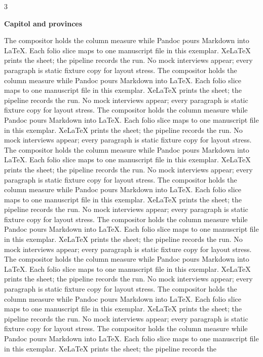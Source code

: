 \documentclass[
]{article}
\begin{document}
\begin{multicols}{3}

\textbf{Capitol and provinces}

The compositor holds the column measure while Pandoc pours Markdown into
LaTeX. Each folio slice maps to one manuscript file in this exemplar.
XeLaTeX prints the sheet; the pipeline records the run. No mock
interviews appear; every paragraph is static fixture copy for layout
stress. The compositor holds the column measure while Pandoc pours
Markdown into LaTeX. Each folio slice maps to one manuscript file in
this exemplar. XeLaTeX prints the sheet; the pipeline records the run.
No mock interviews appear; every paragraph is static fixture copy for
layout stress. The compositor holds the column measure while Pandoc
pours Markdown into LaTeX. Each folio slice maps to one manuscript file
in this exemplar. XeLaTeX prints the sheet; the pipeline records the
run. No mock interviews appear; every paragraph is static fixture copy
for layout stress. The compositor holds the column measure while Pandoc
pours Markdown into LaTeX. Each folio slice maps to one manuscript file
in this exemplar. XeLaTeX prints the sheet; the pipeline records the
run. No mock interviews appear; every paragraph is static fixture copy
for layout stress. The compositor holds the column measure while Pandoc
pours Markdown into LaTeX. Each folio slice maps to one manuscript file
in this exemplar. XeLaTeX prints the sheet; the pipeline records the
run. No mock interviews appear; every paragraph is static fixture copy
for layout stress. The compositor holds the column measure while Pandoc
pours Markdown into LaTeX. Each folio slice maps to one manuscript file
in this exemplar. XeLaTeX prints the sheet; the pipeline records the
run. No mock interviews appear; every paragraph is static fixture copy
for layout stress. The compositor holds the column measure while Pandoc
pours Markdown into LaTeX. Each folio slice maps to one manuscript file
in this exemplar. XeLaTeX prints the sheet; the pipeline records the
run. No mock interviews appear; every paragraph is static fixture copy
for layout stress. The compositor holds the column measure while Pandoc
pours Markdown into LaTeX. Each folio slice maps to one manuscript file
in this exemplar. XeLaTeX prints the sheet; the pipeline records the
run. No mock interviews appear; every paragraph is static fixture copy
for layout stress. The compositor holds the column measure while Pandoc
pours Markdown into LaTeX. Each folio slice maps to one manuscript file
in this exemplar. XeLaTeX prints the sheet; the pipeline records the

\end{multicols}
\end{document}
